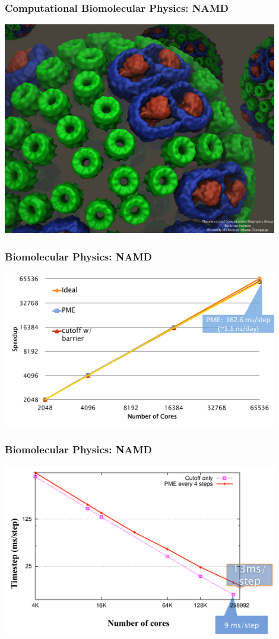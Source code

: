 \begin{frame}
\frametitle{Computational Biomolecular Physics: NAMD}
\includegraphics[width=0.9\textwidth]{../figures/namd/chromatophore-vesicle-2012-01.jpg}
\end{frame}


\begin{frame}
\frametitle{Biomolecular Physics: NAMD}
\includegraphics[width=0.9\textwidth]{../figures/namd_bgp.pdf}
\end{frame}


\begin{frame}
\frametitle{Biomolecular Physics: NAMD}
\includegraphics[width=0.9\textwidth]{../figures/namd_titan.pdf}
\end{frame}


